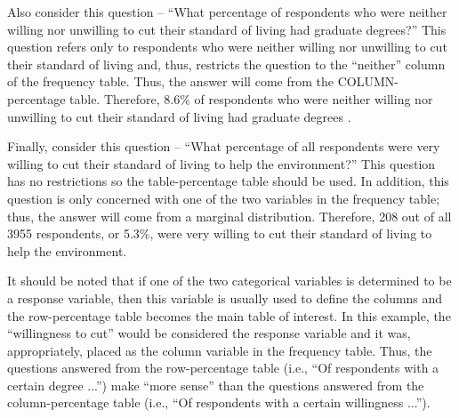 \documentclass[10pt,openany]{book}\usepackage[]{graphicx}\usepackage[]{color}
\begin{document}
Also consider this question -- ``What percentage of respondents who were neither willing nor unwilling to cut their standard of living had graduate degrees?''  This question refers only to respondents who were neither willing nor unwilling to cut their standard of living and, thus, restricts the question to the ``neither'' column of the frequency table.  Thus, the answer will come from the COLUMN-percentage table.  Therefore, 8.6\% of respondents who were neither willing nor unwilling to cut their standard of living had graduate degrees .

Finally, consider this question -- ``What percentage of all respondents were very willing to cut their standard of living to help the environment?''  This question has no restrictions so the table-percentage table should be used.  In addition, this question is only concerned with one of the two variables in the frequency table; thus, the answer will come from a marginal distribution.  Therefore, 208 out of all 3955 respondents, or 5.3\%, were very willing to cut their standard of living to help the environment.


\vspace{-12pt}

It should be noted that if one of the two categorical variables is determined to be a response variable, then this variable is usually used to define the columns and the row-percentage table becomes the main table of interest.  In this example, the ``willingness to cut'' would be considered the response variable and it was, appropriately, placed as the column variable in the frequency table.  Thus, the questions answered from the row-percentage table (i.e., ``Of respondents with a certain degree ...'') make ``more sense'' than the questions answered from the column-percentage table (i.e., ``Of respondents with a certain willingness ...'').

\end{document}
